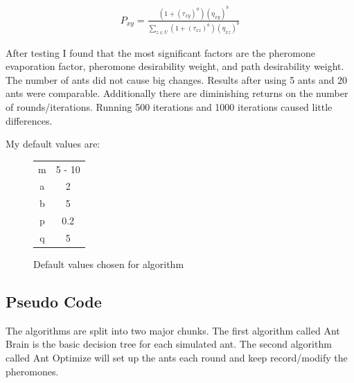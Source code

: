 \documentclass[twocolumn]{article}
\begin{document}
\begin{align}
P_{xy} = \frac{(1 + (\tau_{xy})^a)(\eta_{xy})^b}{\sum_{z \in U}^{}(1 + (\tau_{xz})^a) (\eta_{xz})^b}
\end{align}

After testing I found that the most significant factors are the pheromone evaporation factor,
pheromone desirability weight, and path desirability weight. The number of ants did not cause 
big changes. Results after using 5 ants and 20 ants were comparable. Additionally there are diminishing returns on the number of rounds/iterations. Running 500 iterations and 1000 iterations caused
little differences.

My default values are:

\begin{figure}[h]
\begin{tabular}{|c|S|}
    \hline
    m & {5 - 10}\\
    a & 2\\
    b & 5 \\
    p & 0.2 \\
    q & 5 \\
    \hline
\end{tabular}
\centering
\caption{Default values chosen for algorithm}
\label{fig:defaultVals}
\end{figure}

\subsection{Pseudo Code}

The algorithms are split into two major chunks. The first algorithm called Ant Brain
is the basic decision tree for each simulated ant. The second algorithm called Ant Optimize
will set up the ants each round and keep record/modify the pheromones. 


{}
\SetAlgoLined
\end{document}
